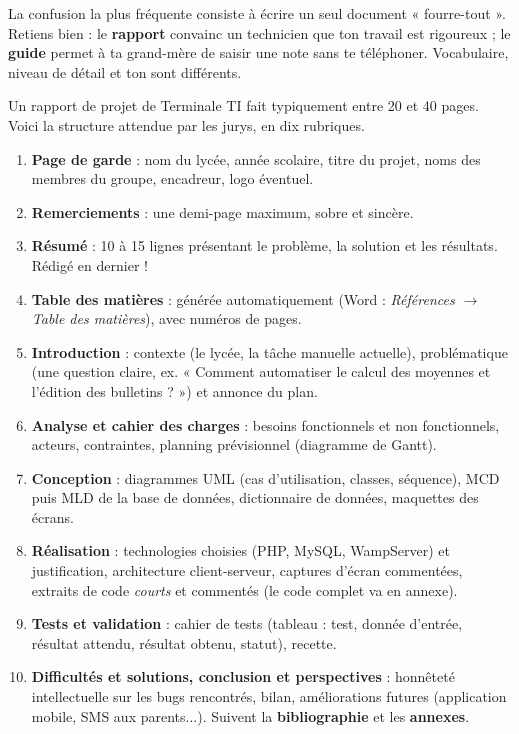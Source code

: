 \documentclass[11pt]{article}
\newcounter{popsec}
\newcounter{popsub}
\newcommand{\courssub}[1]{%
  \stepcounter{popsub}%
  \par\vspace{9pt}\noindent{\popxbold\fontsize{11.5}{13}\selectfont\color{popink}{\color{poporange}\thepopsec.\thepopsub}\hspace{6pt}#1}\par\nopagebreak\vspace{4pt}
}
\begin{document}
\begin{attention}
La confusion la plus fréquente consiste à écrire un seul document « fourre-tout ». Retiens bien : le \textbf{rapport} convainc un technicien que ton travail est rigoureux ; le \textbf{guide} permet à ta grand-mère de saisir une note sans te téléphoner. Vocabulaire, niveau de détail et ton sont différents.
\end{attention}

\courssub{Structure du rapport de réalisation}

Un rapport de projet de Terminale TI fait typiquement entre 20 et 40 pages. Voici la structure attendue par les jurys, en dix rubriques.

\begin{methode}
\begin{enumerate}
\item \textbf{Page de garde} : nom du lycée, année scolaire, titre du projet, noms des membres du groupe, encadreur, logo éventuel.
\item \textbf{Remerciements} : une demi-page maximum, sobre et sincère.
\item \textbf{Résumé} : 10 à 15 lignes présentant le problème, la solution et les résultats. Rédigé en dernier !
\item \textbf{Table des matières} : générée automatiquement (Word : \emph{Références $\rightarrow$ Table des matières}), avec numéros de pages.
\item \textbf{Introduction} : contexte (le lycée, la tâche manuelle actuelle), problématique (une question claire, ex. « Comment automatiser le calcul des moyennes et l'édition des bulletins ? ») et annonce du plan.
\item \textbf{Analyse et cahier des charges} : besoins fonctionnels et non fonctionnels, acteurs, contraintes, planning prévisionnel (diagramme de Gantt).
\item \textbf{Conception} : diagrammes UML (cas d'utilisation, classes, séquence), MCD puis MLD de la base de données, dictionnaire de données, maquettes des écrans.
\item \textbf{Réalisation} : technologies choisies (PHP, MySQL, WampServer) et justification, architecture client-serveur, captures d'écran commentées, extraits de code \emph{courts} et commentés (le code complet va en annexe).
\item \textbf{Tests et validation} : cahier de tests (tableau : test, donnée d'entrée, résultat attendu, résultat obtenu, statut), recette.
\item \textbf{Difficultés et solutions, conclusion et perspectives} : honnêteté intellectuelle sur les bugs rencontrés, bilan, améliorations futures (application mobile, SMS aux parents...). Suivent la \textbf{bibliographie} et les \textbf{annexes}.
\end{enumerate}
\end{methode}
\end{document}
